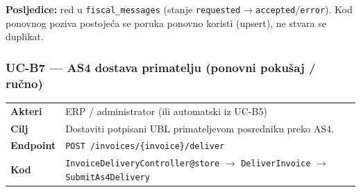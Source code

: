 \documentclass[11pt,a4paper]{article}
\begin{document}
\textbf{Posljedice:} red u \texttt{fiscal\_messages} (stanje \texttt{requested}$\rightarrow$\texttt{accepted}/\texttt{error}). Kod
ponovnog poziva postojeća se poruka ponovno koristi (upsert), ne stvara se duplikat.

\subsubsection{UC-B7 — AS4 dostava primatelju (ponovni pokušaj / ručno)}

\begin{tabularx}{\textwidth}{@{}lY@{}}
\toprule
\textbf{Akteri} & ERP / administrator (ili automatski iz UC-B5) \\
\textbf{Cilj} & Dostaviti potpisani UBL primateljevom posredniku preko AS4. \\
\textbf{Endpoint} & \texttt{POST /invoices/\{invoice\}/deliver} \\
\textbf{Kod} & \texttt{InvoiceDeliveryController@store} $\rightarrow$ \texttt{DeliverInvoice} $\rightarrow$ \texttt{SubmitAs4Delivery} \\
\bottomrule
\end{tabularx}
\end{document}
